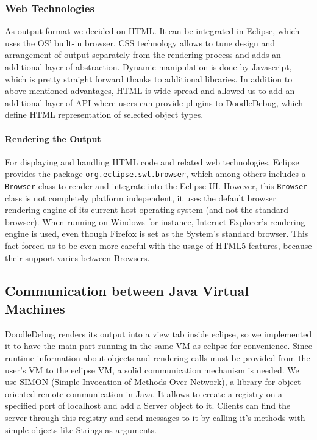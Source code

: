 \documentclass[english]{acm_proc_article-sp}
\begin{document}
\subsubsection{Web Technologies}
As output format we decided on HTML. It can be integrated in Eclipse, which uses the OS' built-in browser. CSS technology allows to tune design and arrangement of output separately from the rendering process and adds an additional layer of abstraction. Dynamic manipulation is done by Javascript, which is pretty straight forward thanks to additional libraries. In addition to above mentioned advantages, HTML is wide-spread and allowed us to add an additional layer of API where users can provide plugins to DoodleDebug, which define HTML representation of selected object types.

\paragraph{Rendering the Output}
For displaying and handling HTML code and related web technologies, Eclipse provides the package \verb-org.eclipse.swt.browser-, which among others includes a \verb.Browser. class to render and integrate into the Eclipse UI. However, this \verb.Browser. class is not completely platform independent, it uses the default browser rendering engine of its current host operating system (and not the standard browser). When running on Windows for instance, Internet Explorer's rendering engine is used, even though Firefox is set as the System's standard browser. This fact forced us to be even more careful with the usage of HTML5 features, because their support varies between Browsers.


\subsection{Communication between Java Virtual Machines}
DoodleDebug renders its output into a view tab inside eclipse, so we implemented it to have the main part running in the same VM as eclipse for convenience. Since runtime information about objects and rendering calls must be provided from the user's VM to the eclipse VM, a solid communication mechanism is needed. We use SIMON (Simple Invocation of Methods Over Network)\cite{simon}, a library for object-oriented remote communication in Java. It allows to create a registry on a specified port of localhost and add a Server object to it. Clients can find the server through this registry and send messages to it by calling it's methods with simple objects like Strings as arguments.
\end{document}
